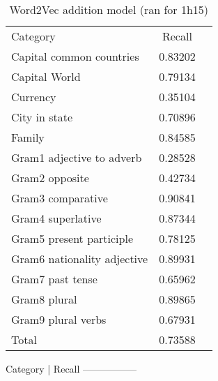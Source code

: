 \label{sec:tabellen}
\begin{center}
    \begin{table}[h!]
        \begin{tabular}{| l | c | r}
        	Category 					& Recall \\
        	Capital common countries 	& 0.83202 \\
        	Capital World 				& 0.79134 \\
        	Currency					& 0.35104 \\
        	City in state				& 0.70896 \\
        	Family 						& 0.84585 \\
        	Gram1 adjective to adverb 	& 0.28528 \\
        	Gram2 opposite 				& 0.42734 \\
        	Gram3 comparative 			& 0.90841 \\
        	Gram4 superlative 			& 0.87344 \\
        	Gram5 present participle	& 0.78125 \\
        	Gram6 nationality adjective & 0.89931 \\
        	Gram7 past tense 			& 0.65962 \\
        	Gram8 plural 				& 0.89865 \\
        	Gram9 plural verbs 			& 0.67931 \\
        	Total 						& 0.73588 \\
        \end{tabular}
    \caption{Word2Vec addition model (ran for 1h15)}
    \label{table:dieren22}
    \end{table}
\end{center}

Category | Recall
-----------------
